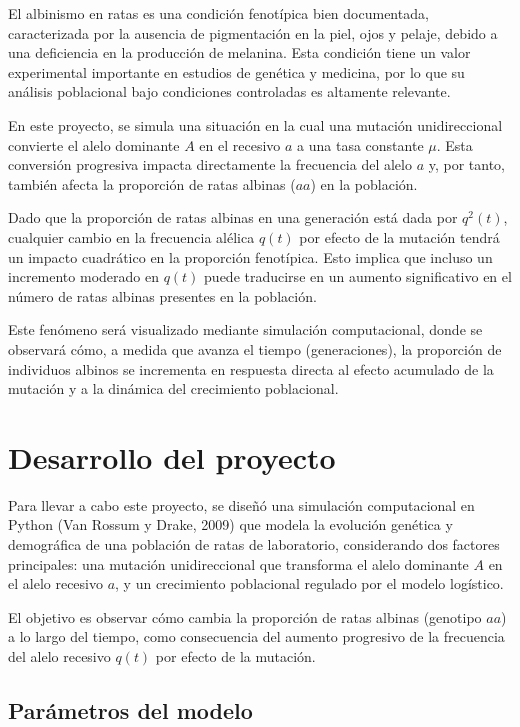 \documentclass[12pt]{article}
\begin{document}
El albinismo en ratas es una condición fenotípica bien documentada, caracterizada por la ausencia de pigmentación en la piel, ojos y pelaje, debido a una deficiencia en la producción de melanina. Esta condición tiene un valor experimental importante en estudios de genética y medicina, por lo que su análisis poblacional bajo condiciones controladas es altamente relevante.

En este proyecto, se simula una situación en la cual una mutación unidireccional convierte el alelo dominante $A$ en el recesivo $a$ a una tasa constante $\mu$. Esta conversión progresiva impacta directamente la frecuencia del alelo $a$ y, por tanto, también afecta la proporción de ratas albinas ($aa$) en la población.

Dado que la proporción de ratas albinas en una generación está dada por $q^2(t)$, cualquier cambio en la frecuencia alélica $q(t)$ por efecto de la mutación tendrá un impacto cuadrático en la proporción fenotípica. Esto implica que incluso un incremento moderado en $q(t)$ puede traducirse en un aumento significativo en el número de ratas albinas presentes en la población.

Este fenómeno será visualizado mediante simulación computacional, donde se observará cómo, a medida que avanza el tiempo (generaciones), la proporción de individuos albinos se incrementa en respuesta directa al efecto acumulado de la mutación y a la dinámica del crecimiento poblacional.


\section{Desarrollo del proyecto}



Para llevar a cabo este proyecto, se diseñó una simulación computacional en Python (Van Rossum y Drake, 2009) que modela la evolución genética y demográfica de una población de ratas de laboratorio, considerando dos factores principales: una mutación unidireccional que transforma el alelo dominante $A$ en el alelo recesivo $a$, y un crecimiento poblacional regulado por el modelo logístico.

El objetivo es observar cómo cambia la proporción de ratas albinas (genotipo $aa$) a lo largo del tiempo, como consecuencia del aumento progresivo de la frecuencia del alelo recesivo $q(t)$ por efecto de la mutación.

\subsection*{Parámetros del modelo}
\end{document}
